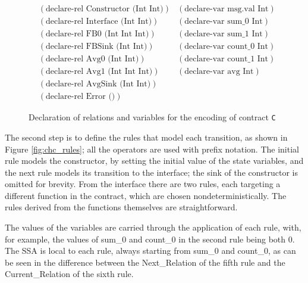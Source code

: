 \begin{figure}[ht]
	\centering
	\begin{align*}
    & (\text{declare-rel Constructor (Int Int)}) && (\text{declare-var msg.val Int}) & \\
    & (\text{declare-rel Interface (Int Int)}) && (\text{declare-var sum\_0 Int}) \\
    & (\text{declare-rel FB0 (Int Int Int)}) && (\text{declare-var sum\_1 Int}) \\
    & (\text{declare-rel FBSink (Int Int)}) && (\text{declare-var count\_0 Int}) \\
    & (\text{declare-rel Avg0 (Int Int)}) && (\text{declare-var count\_1 Int}) \\
    & (\text{declare-rel Avg1 (Int Int Int)}) && (\text{declare-var avg Int}) \\
    & (\text{declare-rel AvgSink (Int Int)}) && \\
    & (\text{declare-rel Error ()}) &&
	\end{align*}
	\caption{Declaration of relations and variables for the encoding of contract \texttt{C}}
	\label{fig:chc_rel-and-var}
\end{figure}

The second step is to define the rules that model each transition, as shown in Figure \ref{fig:chc_rules}; all the operators are used with prefix notation. The initial rule models the constructor, by setting the initial value of the state variables, and the next rule models its transition to the interface; the sink of the constructor is omitted for brevity. From the interface there are two rules, each targeting a different function in the contract, which are chosen nondeterministically. The rules derived from the functions themselves are straightforward.

The values of the variables are carried through the application of each rule, with, for example, the values of sum\_0 and count\_0 in the second rule being both 0. The SSA is local to each rule, always starting from sum\_0 and count\_0, as can be seen in the difference between the Next\_Relation of the fifth rule and the Current\_Relation of the sixth rule.

